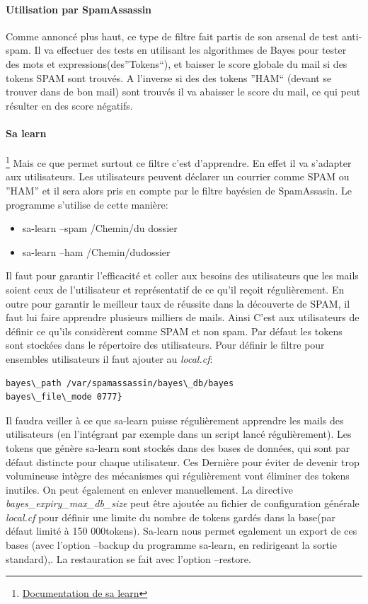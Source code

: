 \documentclass[a4paper,11pt]{article}
\begin{document}
\paragraph{Utilisation par SpamAssassin}

Comme annoncé plus haut, ce type de filtre fait partis de son arsenal de test anti-spam. Il va effectuer des tests 
en utilisant les algorithmes de Bayes pour tester des mots et expressions(des''Tokens``), et baisser le score globale du mail si des tokens SPAM sont trouvés. 
A l'inverse si des des tokens ''HAM`` (devant se trouver dans de bon mail) sont trouvés il va abaisser le score du mail, ce qui peut résulter en
des score négatifs.
\linebreak

\paragraph{Sa learn}\footnote{\href{https://spamassassin.apache.org/full/3.1.x/doc/sa-learn.html}{Documentation de sa learn}}
Mais ce que permet surtout ce filtre c'est d'apprendre. En effet il va s'adapter aux utilisateurs. Les utilisateurs
peuvent déclarer un courrier comme SPAM ou ''HAM'' et il sera alors pris en compte par le filtre bayésien de SpamAssasin.
Le programme s'utilise de cette manière:
\begin{itemize}
 \item sa-learn --spam /Chemin/du dossier
 \item sa-learn --ham /Chemin/dudossier
\end{itemize}
Il faut pour garantir l'efficacité et coller aux besoins des utilisateurs que les mails soient ceux de l’utilisateur 
et représentatif de ce qu'il reçoit régulièrement. En outre pour garantir le meilleur taux de réussite
dans la découverte de SPAM, il faut lui faire apprendre plusieurs milliers de mails. Ainsi C'est aux utilisateurs de définir 
ce qu'ils considèrent comme SPAM et non spam. 
\linebreak
Par défaut les tokens sont stockées dans le répertoire des utilisateurs. Pour définir le filtre pour ensembles utilisateurs il faut ajouter 
au \emph{local.cf}:
\begin{lstlisting}[frame=single]
bayes\_path /var/spamassassin/bayes\_db/bayes
bayes\_file\_mode 0777}
\end{lstlisting}
Il faudra veiller à ce que sa-learn puisse régulièrement apprendre les mails des utilisateurs (en l'intégrant par exemple dans un script lancé régulièrement).
\linebreak
Les tokens que génère sa-learn sont stockés dans des bases de données, qui sont par défaut distincte pour chaque utilisateur. Ces Dernière pour éviter de devenir 
trop volumineuse intègre des mécanismes qui régulièrement vont éliminer des tokens inutiles. On peut également en enlever manuellement.
La directive \emph{bayes\_expiry\_max\_db\_size} peut être ajoutée au fichier de configuration générale 
\emph{local.cf} pour définir une limite du nombre de tokens gardés dans la base(par défaut limité à 150 000tokens).
\linebreak
Sa-learn nous permet egalement un export de ces bases (avec l'option --backup du programme sa-learn, en redirigeant la sortie standard),. La restauration se fait 
avec l'option --restore. 
\end{document}
